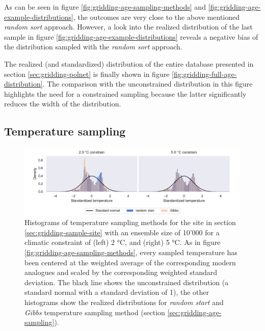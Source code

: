 \documentclass[
11pt, %
english, %
singlespacing, %
headsepline, %
]{MastersDoctoralThesis} %
\begin{document}
\begin{NoHyper}
\begin{refsection}
As can be seen in figure \ref{fig:gridding-age-sampling-methods} and \ref{fig:gridding-age-example-distributions}, the outcomes are very close to the above mentioned \textit{random sort} approach. However, a look into the realized distribution of the last sample in figure \ref{fig:gridding-age-example-distributions} reveals a negative bias of the distribution sampled with the \textit{random sort} approach.

The realized (and standardized) distribution of the entire database presented in section \ref{sec:gridding-polnet} is finally shown in figure \ref{fig:gridding-full-age-distribution}. The comparison with the unconstrained distribution in this figure highlights the need for a constrained sampling because the latter significantly reduces the width of the distribution.

\subsection{Temperature sampling}  \label{sec:gridding-temperature-sampling}

\begin{figure}[h]
	\includegraphics[width=\linewidth]{gridding-figures/temp-sampling-methods-realized.pdf}
	\caption[Scaled histograms of temperature sampling methods]{Histograms of temperature sampling methods for the site in section \ref{sec:gridding-sample-site} with an ensemble size of 10'000 for a climatic constraint of (left) 2 °C, and (right) 5 °C. As in figure \ref{fig:gridding-age-sampling-methods}, every sampled temperature has been centered at the weighted average of the corresponding modern analogues and scaled by the corresponding weighted standard deviation. The black line shows the unconstrained distribution (a standard normal with a standard deviation of 1), the other histograms show the realized distributions for \textit{random start} and \textit{Gibbs} temperature sampling method (section \ref{sec:gridding-age-sampling}).}
	\label{fig:gridding-temp-sampling-methods}
\end{figure}


\end{refsection}
\end{NoHyper}
\end{document}
